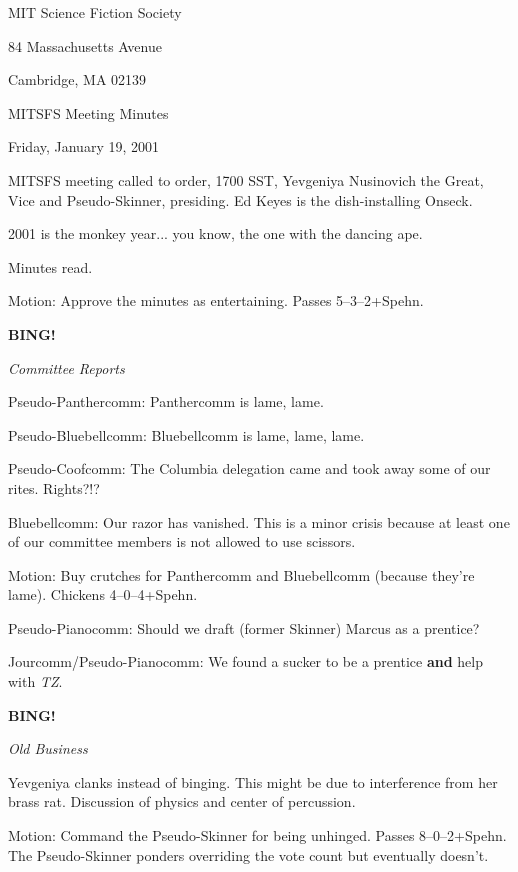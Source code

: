 \documentclass[12pt]{article}
\newcommand{\bing}{{\bf BING!} }
\newcommand{\goto}[1]{\bing \vskip 12pt \centerline{{\em{#1}}}}
\begin{document}
\begin{center}

MIT Science Fiction Society 

84 Massachusetts Avenue

Cambridge, MA 02139

\vspace{12pt}

MITSFS Meeting Minutes 

Friday, January 19, 2001

\end{center}
 
\vspace{18pt}

\setlength{\parskip}{6pt}

\noindent
MITSFS meeting called to order, 1700 SST, Yevgeniya Nusinovich the
Great, Vice and Pseudo-Skinner, presiding.  Ed Keyes is the
dish-installing Onseck.

2001 is the monkey year... you know, the one with the dancing ape.

Minutes read.

Motion: Approve the minutes as entertaining.  Passes 5--3--2+Spehn.

\goto{Committee Reports}

Pseudo-Panthercomm: Panthercomm is lame, lame.

Pseudo-Bluebellcomm: Bluebellcomm is lame, lame, lame.

Pseudo-Coofcomm: The Columbia delegation came and took away some of
our rites.  Rights?!?

Bluebellcomm: Our razor has vanished.  This is a minor crisis because
at least one of our committee members is not allowed to use scissors.

Motion: Buy crutches for Panthercomm and Bluebellcomm (because they're
lame).  Chickens 4--0--4+Spehn.

Pseudo-Pianocomm: Should we draft (former Skinner) Marcus as a prentice?

Jourcomm/Pseudo-Pianocomm: We found a sucker to be a prentice {\bf and}
help with {\em TZ}.

\goto{Old Business}

Yevgeniya clanks instead of binging.  This might be due to interference
from her brass rat.  Discussion of physics and center of percussion.

Motion: Command the Pseudo-Skinner for being unhinged.  Passes
8--0--2+Spehn.  The Pseudo-Skinner ponders overriding the vote count
but eventually doesn't.
\end{document}
